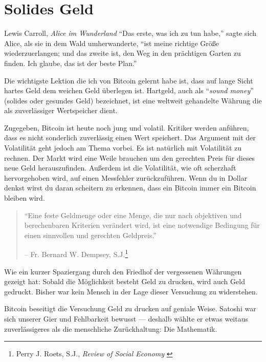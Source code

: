 \chapter{Solides Geld}
\label{les:14}

\begin{chapquote}{Lewis Carroll, \textit{Alice im Wunderland}}
\enquote{Das erste, was ich zu tun habe,} sagte sich Alice, als sie in dem Wald
umherwanderte, \enquote{ist meine richtige Größe wiederzuerlangen; und das
zweite ist, den Weg in den prächtigen Garten zu finden. Ich glaube, das ist der
beste Plan.}
\end{chapquote}

Die wichtigste Lektion die ich von Bitcoin gelernt habe ist, dass auf lange
Sicht hartes Geld dem weichen Geld überlegen ist. Hartgeld, auch als
\enquote{\textit{sound money}} (solides oder gesundes Geld) bezeichnet, ist eine
weltweit gehandelte Währung die als zuverlässiger Wertspeicher dient.

Zugegeben, Bitcoin ist heute noch jung und volatil. Kritiker werden anführen,
dass es nicht sonderlich zuverlässig einen Wert speichert. Das Argument mit der
Volatilität geht jedoch am Thema vorbei. Es ist natürlich mit Volatilität zu
rechnen. Der Markt wird eine Weile brauchen um den gerechten Preis für dieses
neue Geld herauszufinden. Außerdem ist die Volatilität, wie oft scherzhaft
hervorgehoben wird, auf einen Messfehler zurückzuführen. Wenn du in Dollar
denkst wirst du daran scheitern zu erkennen, dass ein Bitcoin immer ein Bitcoin
bleiben wird.

\begin{quotation}\begin{samepage}
\enquote{Eine feste Geldmenge oder eine Menge, die nur nach objektiven und
berechenbaren Kriterien verändert wird, ist eine notwendige Bedingung für einen
sinnvollen und gerechten Geldpreis.}
\begin{flushright} -- Fr. Bernard W. Dempsey, S.J.\footnote{Perry J. Roets, S.J., \textit{Review of Social Economy} \cite{review-social-economy}}
\end{flushright}\end{samepage}\end{quotation}

Wie ein kurzer Spaziergang durch den Friedhof der vergessenen Währungen gezeigt
hat: Sobald die Möglichkeit besteht Geld zu drucken, wird auch Geld gedruckt.
Bisher war kein Mensch in der Lage dieser Versuchung zu widerstehen.

Bitcoin beseitigt die Versuchung Geld zu drucken auf geniale Weise. Satoshi war
sich unserer Gier und Fehlbarkeit bewusst --- deshalb wählte er etwas weitaus
zuverlässigeres als die menschliche Zurückhaltung: Die Mathematik.

